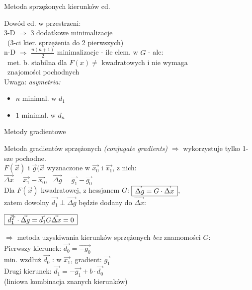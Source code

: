   \begin{frame}{Metoda sprzężonych kierunków cd. }

   \begin{block}{Dowód cd.}
	  w przestrzeni:
	  \smallskip
	  \\3-D $\Rightarrow$ 3 dodatkowe minimalizacje
	  \\ \ (3-ci kier. sprzężenia do 2 pierwszych)
	  \\n-D $\Rightarrow$ $\frac{n(n+1)}{2}$ minimalizacje - ile elem. w $G$ - ale:
	  \\ \ met. b. stabilna dla $F(x) \neq$ kwadratowych i nie wymaga
	  \\ \ znajomości pochodnych
	  \medskip
	  \\Uwaga: \emph{asymetria:}
	  \begin{itemize}
	  	  \item $n$ minimal. w $d_1$
	  	  \item $1$ minimal. w $d_n$
	  \end{itemize}
 	\end{block}

  \end{frame}

  \begin{frame}{Metody gradientowe}

 	\begin{block}{Metoda gradientów sprzężonych \emph{(conjugate gradients)}}
 	   $\Rightarrow$ wykorzystuje tylko 1-sze pochodne.
 	   \medskip
 	   \\ $F(\vec{x})$ i $\vec{g}(\vec{x}$ wyznaczone w $\vec{x_0}$ i $\vec{x_1}$, z nich:
 	   \smallskip
 	   \\ $\vec{\Delta x} = \vec{x_1} - \vec{x_0}$, \ $\vec{\Delta g} = \vec{g_1} - \vec{g_0}$
 	   \smallskip
 	   \\ Dla $F(\vec{x})$ kwadratowej, z hessjanem $G$:
 	   $\begin{array}{|c|}
 	   	  \hline
 	   	  \vec{\Delta g} = G \cdot \vec{\Delta x}
 	   	  \\ \hline
 	   \end{array}$,
 	   \\zatem dowolny $\vec{d_1} \perp \vec{\Delta g}$ będzie dodany do $\vec{\Delta x}$:
 	   \begin{center}
 	      $\begin{array}{|c|}
 	   	    \hline
 	   	    \vec{d_1^T} \cdot \vec{\Delta g} = \vec{d_1} G \vec{\Delta x} = 0
 	   	    \\ \hline
 	      \end{array}$
 	   \end{center}
 	   \smallskip
 	   $\Rightarrow$ metoda uzyskiwania kierunków sprzężonych \emph{bez} znamomości $G$:
 	   \\Pierwszy kierunek: $\vec{d_0} = \vec{-g_0}$
 	   \\min. wzdłuż $\vec{d_0}$ : w $\vec{x_1}$, gradient:  $\vec{g_1}$
 	   \\Drugi kierunek: $\vec{d_1} = -\vec{g_1} + b \cdot \vec{d_0}$
 	   \\(liniowa kombinacja znanych kierunków)
 	\end{block}

  \end{frame}

